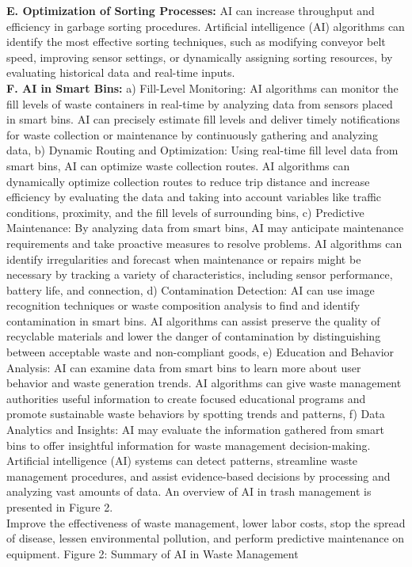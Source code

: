 \documentclass[a4paper,11pt,onecolumn]{article}
\begin{document}
\textbf{E. Optimization of Sorting Processes:} AI can increase throughput and efficiency in garbage sorting procedures. Artificial intelligence (AI) algorithms can identify the most effective sorting techniques, such as modifying conveyor belt speed, improving sensor settings, or dynamically assigning sorting resources, by evaluating historical data and real-time inputs.\\
\textbf{F. AI in Smart Bins:} a) Fill-Level Monitoring: AI algorithms can monitor the fill levels of waste containers in real-time by analyzing data from sensors placed in smart bins. AI can precisely estimate fill levels and deliver timely notifications for waste collection or maintenance by continuously gathering and analyzing data, b) Dynamic Routing and Optimization: Using real-time fill level data from smart bins, AI can optimize waste collection routes. AI algorithms can dynamically optimize collection routes to reduce trip distance and increase efficiency by evaluating the data and taking into account variables like traffic conditions, proximity, and the fill levels of surrounding bins, c) Predictive Maintenance: By analyzing data from smart bins, AI may anticipate maintenance requirements and take proactive measures to resolve problems. AI algorithms can identify irregularities and forecast when maintenance or repairs might be necessary by tracking a variety of characteristics, including sensor performance, battery life, and connection, d) Contamination Detection: AI can use image recognition techniques or waste composition analysis to find and identify contamination in smart bins. AI algorithms can assist preserve the quality of recyclable materials and lower the danger of contamination by distinguishing between acceptable waste and non-compliant goods, e) Education and Behavior Analysis: AI can examine data from smart bins to learn more about user behavior and waste generation trends. AI algorithms can give waste management authorities useful information to create focused educational programs and promote sustainable waste behaviors by spotting trends and patterns, f) Data Analytics and Insights:  AI may evaluate the information gathered from smart bins to offer insightful information for waste management decision-making. Artificial intelligence (AI) systems can detect patterns, streamline waste management procedures, and assist evidence-based decisions by processing and analyzing vast amounts of data. An overview of AI in trash management is presented in Figure 2.\newline \\
Improve the effectiveness of waste management, lower labor costs, stop the spread of disease, lessen environmental pollution, and perform predictive maintenance on equipment.
Figure 2: Summary of AI in Waste Management\\
\end{document}
